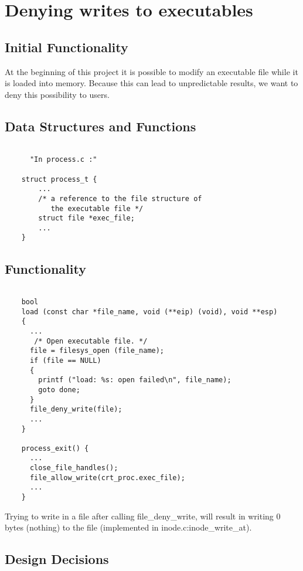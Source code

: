 \section{Denying writes to executables}

     \subsection{Initial Functionality}

	At the beginning of this project it is possible to modify an executable file while it is loaded into memory. Because this can lead to unpredictable results, we want to deny this possibility to users.

    \subsection{Data Structures and Functions}

    \begin{lstlisting}

      "In process.c :"
	
	struct process_t {
	    ...
	    /* a reference to the file structure of 
	       the executable file */
	    struct file *exec_file;
	    ...
	}

    \end{lstlisting}


    \subsection{Functionality}
   \begin{lstlisting}

	bool
	load (const char *file_name, void (**eip) (void), void **esp) 
	{
	  ...
	   /* Open executable file. */
	  file = filesys_open (file_name);
	  if (file == NULL) 
	  {
	    printf ("load: %s: open failed\n", file_name);
	    goto done; 
	  }
	  file_deny_write(file);
	  ...
	}

	process_exit() {
	  ...
	  close_file_handles();
	  file_allow_write(crt_proc.exec_file);
	  ...
	}	
    \end{lstlisting}

    Trying to write in a file after calling file\_deny\_write, will result in writing 0 bytes (nothing) to the file (implemented in inode.c:inode\_write\_at).

    \subsection{Design Decisions}

